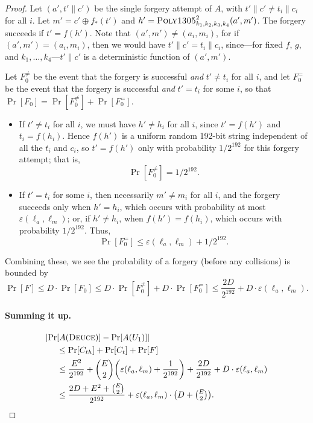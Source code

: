 \documentclass[draft]{article}
\def\operatorsc#1{{%
  \ifmmode\let\next=\operatorname\else\let\next=\relax\fi\next{\textsc{#1}}}}
\def\Poly#1/{\operatorsc{Poly#1}}
\def\Deuce/{\operatorsc{Deuce}}
\newcommand{\concat}{\mathbin\|}
\newcommand{\collisionbound}{\varepsilon}
\begin{document}
\begin{proof}
Let $(a', t' \concat c')$ be the single forgery attempt of $A$,
 with
 $t' \concat c' \ne t_i \concat c_i$
 for all $i$.
Let
 $m' = c' \oplus f_*(t')$
 and
 $h' = \Poly1305/^2_{k_1,k_2,k_3,k_4}(a', m')$.
The forgery succeeds if $t' = f(h')$.
Note that $(a', m') \ne (a_i, m_i)$, for if
 $(a', m') = (a_i, m_i)$,
 then we would have
 $t' \concat c' = t_i \concat c_i$, since---for fixed $f$, $g$, and
 $k_1,\dotsc,k_4$---$t' \concat c'$ is a deterministic function of
 $(a', m')$.

Let $F_0^{\ne}$ be the event that the forgery is successful \emph{and}
 $t' \ne t_i$ for all $i$, and let $F_0^=$ be the event that the
 forgery is successful \emph{and} $t' = t_i$ for some $i$, so that
 $\Pr[F_0] = \Pr[F_0^{\ne}] + \Pr[F_0^=]$.
%
\begin{itemize}
  \item
    If $t' \ne t_i$ for all $i$, we must have $h' \ne h_i$ for all $i$,
     since $t' = f(h')$ and $t_i = f(h_i)$.
    Hence $f(h')$ is a uniform random 192-bit string independent of all
     the $t_i$ and $c_i$, so $t' = f(h')$ only with probability
     $1/2^{192}$ for this forgery attempt; that is,
    \[
      \Pr[F_0^{\ne}] = 1/2^{192}.
    \]
  \item
    If $t' = t_i$ for some $i$, then necessarily $m' \ne m_i$ for all
     $i$, and the forgery succeeds only when $h' = h_i$, which occurs
     with probability at most $\collisionbound(\ell_a, \ell_m)$; or, if
     $h' \ne h_i$, when $f(h') = f(h_i)$, which occurs with probability
     $1/2^{192}$.
    Thus,
    \[
      \Pr[F_0^=] \leq \collisionbound(\ell_a, \ell_m) + 1/2^{192}.
    \]
\end{itemize}
%
Combining these, we see the probability of a forgery (before any
 collisions) is bounded by
\[
  \Pr[F]
  \leq D \cdot \Pr[F_0]
  \leq D \cdot \Pr[F_0^{\ne}] + D \cdot \Pr[F_0^=]
  \leq \frac{2 D}{2^{192}} + D \cdot \collisionbound(\ell_a, \ell_m).
\]

\paragraph*{Summing it up.}

\begin{align*}
  \lvert\Pr&[A(\Deuce/)] - \Pr[A(U_1)]\rvert \\
  &\leq \Pr[C_{th}] + \Pr[C_t] + \Pr[F] \\
  &\leq \frac{E^2}{2^{192}}
     + \binom{E}{2} \biggl(
         \collisionbound(\ell_a, \ell_m)
         + \frac{1}{2^{192}}
       \biggr)
     + \frac{2 D}{2^{192}} + D \cdot \collisionbound(\ell_a, \ell_m) \\
  &\leq \frac{2 D + E^2 + \binom{E}{2}}{2^{192}}
     + \collisionbound(\ell_a, \ell_m)
       \cdot
       {\textstyle\bigl(D + \binom{E}{2}\bigr)}.
  \qedhere
\end{align*}

\end{proof}

\end{document}
